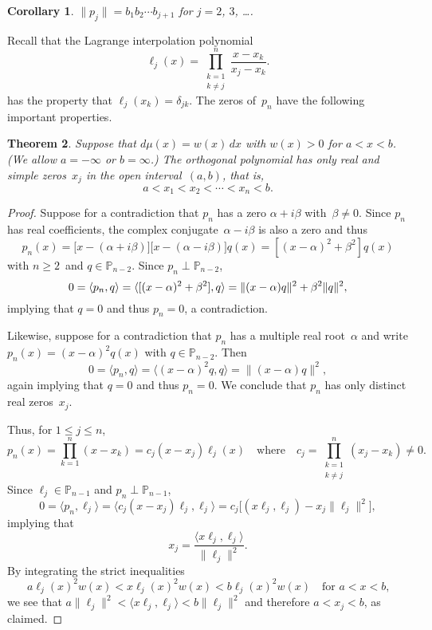 \documentclass[12pt,a4paper]{article}
\newtheorem{theorem}{Theorem}
\newtheorem{corollary}[theorem]{Corollary}
\newcommand{\iprod}[1]{\langle#1\rangle}
\newcommand{\Poly}{\mathbb{P}}
\begin{document}
\begin{corollary}
$\|p_j\|=b_1b_2\cdots b_{j+1}$ for $j=2$, $3$, \dots.
\end{corollary}

Recall that the Lagrange interpolation polynomial
\[
\ell_j(x)=\prod_{\substack{k=1\\ k\ne j}}^n\frac{x-x_k}{x_j-x_k}.
\]
has the property that $\ell_j(x_k)=\delta_{jk}$. The zeros of~$p_n$ 
have the following important properties.  

\begin{theorem}
Suppose that $d\mu(x)=w(x)\,dx$ with $w(x)>0$ for $a<x<b$.
(We allow $a=-\infty$ or $b=\infty$.) The orthogonal polynomial has 
only real and simple zeros~$x_j$ in the open interval~$(a,b)$, that 
is,
\[
a<x_1<x_2<\cdots<x_n<b.
\]
\end{theorem}
\begin{proof}
Suppose for a contradiction that $p_n$ has a zero $\alpha+i\beta$ 
with~$\beta\ne0$.  Since $p_n$ has real coefficients, 
the complex conjugate~$\alpha-i\beta$ is also a zero and thus
\[
p_n(x)=\bigl[x-(\alpha+i\beta)\bigr]\bigl[x-(\alpha-i\beta)\bigr]q(x)
	=[(x-\alpha)^2+\beta^2]q(x)
\]
with $n\ge2$~and $q\in\Poly_{n-2}$. Since $p_n\perp\Poly_{n-2}$,
\[
0=\iprod{p_n,q}=\iprod{[(x-\alpha)^2+\beta^2],q}\\
	=\|(x-\alpha)q\|^2+\beta^2\|q\|^2,
\]
implying that $q=0$ and thus $p_n=0$, a contradiction.

Likewise, suppose for a contradiction that $p_n$ has a multiple real 
root~$\alpha$ and write $p_n(x)=(x-\alpha)^2q(x)$ with 
$q\in\Poly_{n-2}$.  Then
\[
0=\iprod{p_n,q}=\iprod{(x-\alpha)^2q,q}=\|(x-\alpha)q\|^2,
\]
again implying that $q=0$ and thus $p_n=0$.  We conclude that $p_n$ 
has only distinct real zeros~$x_j$.

Thus, for $1\le j\le n$,
\[
p_n(x)=\prod_{k=1}^n(x-x_k)=c_j(x-x_j)\ell_j(x)
\quad\text{where}\quad
c_j=\prod_{\substack{k=1\\ k\ne j}}^n(x_j-x_k)\ne0.
\]
Since $\ell_j\in\Poly_{n-1}$ and $p_n\perp\Poly_{n-1}$,
\[
0=\iprod{p_n,\ell_j}=\iprod{c_j(x-x_j)\ell_j,\ell_j}
	=c_j\bigl[(x\ell_j,\ell_j)-x_j\|\ell_j\|^2\bigr],
\]
implying that
\[
x_j=\frac{\iprod{x\ell_j,\ell_j}}{\|\ell_j\|^2}.
\]
By integrating the strict inequalities
\[
a\ell_j(x)^2w(x)<x\ell_j(x)^2w(x)<b\ell_j(x)^2w(x)
	\quad\text{for $a<x<b$,}
\]
we see that $a\|\ell_j\|^2<\iprod{x\ell_j,\ell_j}<b\|\ell_j\|^2$
and therefore $a<x_j<b$, as claimed.
\end{proof}
\end{document}
